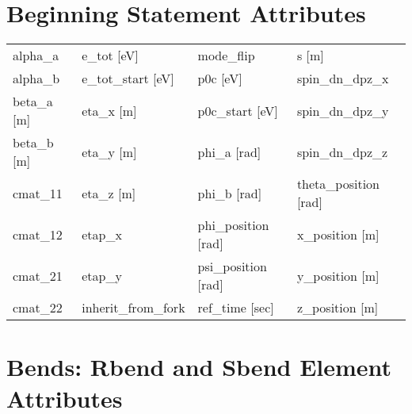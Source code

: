  \vfill
 
 \section{Beginning Statement Attributes}
 \label{s:list.beginning}
 
 \begin{tabular}{llll} \toprule
alpha_a                          & e_tot [eV]                       & mode_flip                        & s [m]                            \\
alpha_b                          & e_tot_start [eV]                 & p0c [eV]                         & spin_dn_dpz_x                    \\
beta_a [m]                       & eta_x [m]                        & p0c_start [eV]                   & spin_dn_dpz_y                    \\
beta_b [m]                       & eta_y [m]                        & phi_a [rad]                      & spin_dn_dpz_z                    \\
cmat_11                          & eta_z [m]                        & phi_b [rad]                      & theta_position [rad]             \\
cmat_12                          & etap_x                           & phi_position [rad]               & x_position [m]                   \\
cmat_21                          & etap_y                           & psi_position [rad]               & y_position [m]                   \\
cmat_22                          & inherit_from_fork                & ref_time [sec]                   & z_position [m]                   \\
 \bottomrule
 \end{tabular}
 \vfill
 
 \section{Bends: Rbend and Sbend Element Attributes}
 \label{s:list.bend}
 
